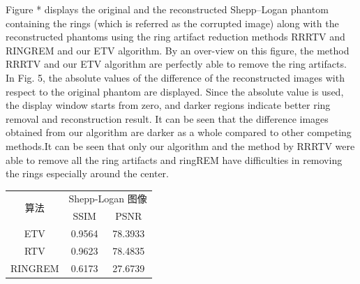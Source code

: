 \documentclass[hyperref]{ctexart}
\begin{document}
{			\begin{multicols}{2}
		
		
		 Figure * displays the original and the reconstructed Shepp–Logan phantom containing the rings (which is referred as the corrupted image) along with the reconstructed phantoms using the ring artifact reduction methods RRRTV and RINGREM and our ETV algorithm. By an over-view on this figure, the method RRRTV and our ETV algorithm are perfectly able to remove the ring artifacts. In Fig. 5, the absolute values of the difference of the reconstructed images with respect to the original phantom are displayed. Since the absolute value is used, the display window starts from zero, and darker regions indicate better ring removal and reconstruction result. It can be seen that the difference images obtained from our algorithm are darker as a whole compared to other competing methods.It can be seen that only our algorithm and the method by RRRTV were able to remove all the ring artifacts and ringREM have difficulties in removing the rings especially around the center. 
		
		\begin{tabular}{ccc}
			\hline
			\multirow{2}{*}{算法} & \multicolumn{2}{c}{Shepp-Logan 图像}  \\
			& SSIM             & PSNR                 \\ \hline
			ETV                  & 0.9564                & 78.3933                 \\
			RTV                 & 0.9623                & 78.4835                \\
			RINGREM               & 0.6173                & 27.6739                   \\ \hline
		\end{tabular}
		\end{multicols}
	
}
\end{document}
